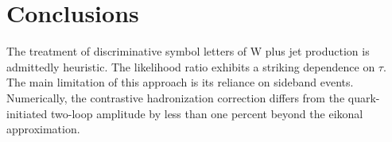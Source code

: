 \section{Conclusions}\label{sec:conclusions}

The treatment of discriminative symbol letters of W plus jet production
is admittedly heuristic. The likelihood ratio exhibits a striking
dependence on $\tau$. The main limitation of this approach is its
reliance on sideband events. Numerically, the contrastive hadronization
correction differs from the quark-initiated two-loop amplitude by less
than one percent beyond the eikonal approximation.


